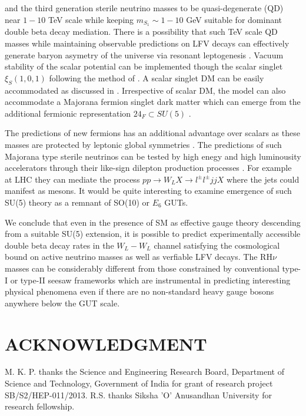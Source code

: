 \documentclass[a4paper,11pt]{article}
\begin{document}
and the third generation sterile neutrino masses to be
quasi-degenerate (QD) near $1-10$ TeV scale while keeping $m_{S_1}\sim
1-10$ GeV suitable for dominant double beta decay mediation. There is a possibility that such TeV
scale QD masses while maintaining observable predictions on LFV decays  can effectively generate baryon asymetry of the universe
via resonant leptogenesis \cite{bpn-mkp:2015}.
Vacuum stability of the scalar potential can be implemented though the scalar singlet
$\xi_S(1,0,1)$ following the method of
\cite{falkowski:2014,spc:2017}. A scalar singlet DM can be easily
accommodated as discussed in \cite{scp:2018}. Irrespective of scalar DM,
the model can also  accommodate a Majorana fermion singlet dark matter \cite{strumia:2006} which can emerge from the additional fermionic representation ${24}_F\subset SU(5)$ .         

The predictions of new fermions has an additional advantage over scalars as 
these masses are protected by leptonic global symmetries \cite{tHooft}.
The predictions of such Majorana type sterile neutrinos  can be tested
by high enegy and high luminousity accelerators through their
like-sign dilepton production processes  \cite{bpn-mkp:arx}. For example at LHC they can mediate the process $pp\to W_L X \to l^{\pm}l^{\pm}jjX$ where the jets could manifest as mesons. It would be quite interesting to examine emergence of such SU(5) theory as a remnant of SO(10) or $E_6$ GUTs. 

We conclude that even in the presence of SM as effective gauge theory
  descending from a suitable SU(5) extension, it is possible to predict
  experimentally accessible double beta decay rates in the $W_L-W_L$ channel satisfying the
  cosmological bound on active neutrino masses as well as verfiable
  LFV decays. The RH$\nu$ masses can be considerably
  different from those constrained by conventional type-I or type-II
  seesaw frameworks which are instrumental in predicting interesting physical phenomena even
  if there are no non-standard heavy gauge bosons anywhere below the 
GUT scale. 
 

            
\section {\bf ACKNOWLEDGMENT }
M. K. P. thanks the Science and Engineering Research Board, Department
of Science and Technology, Government of India for grant of research
project SB/S2/HEP-011/2013. R.S. thanks  Siksha 'O' Anusandhan 
University for research fellowship.\\
\end{document}
